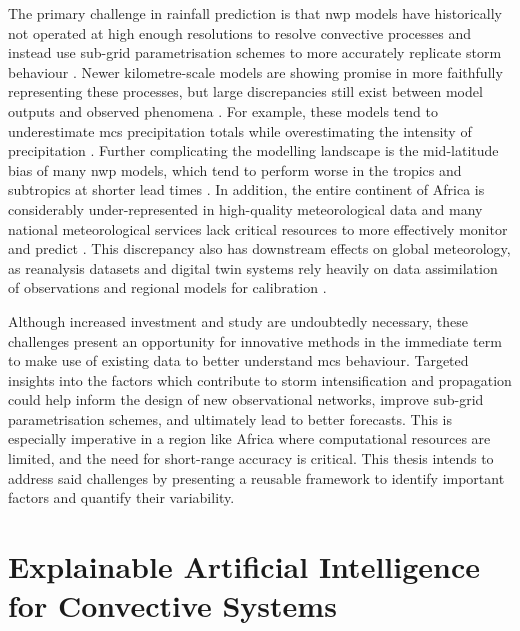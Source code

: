 The primary challenge in rainfall prediction is that \acrfull{nwp} models have historically not operated at high enough resolutions to resolve convective processes and instead use sub-grid parametrisation schemes to more accurately replicate storm behaviour \citep{Stevens2019,Yano2018}. Newer kilometre-scale models are showing promise in more faithfully representing these processes, but large discrepancies still exist between model outputs and observed phenomena \citep{Yano2018}. For example, these models tend to underestimate \acrshort{mcs} precipitation totals while overestimating the intensity of precipitation \citep{Feng2025,Stevens2019}. Further complicating the modelling landscape is the mid-latitude bias of many \acrshort{nwp} models, which tend to perform worse in the tropics and subtropics at shorter lead times \citep{Keane2025}. In addition, the entire continent of Africa is considerably under-represented in high-quality meteorological data and many national meteorological services lack critical resources to more effectively monitor and predict  \citep{Dinku2019,Kinyondo2018,Meque2021}. This discrepancy also has downstream effects on global meteorology, as reanalysis datasets and digital twin systems rely heavily on data assimilation of observations and regional models for calibration \citep{Linsenmeier2023,Valmassoi2023}. 

Although increased investment and study are undoubtedly necessary, these challenges present an opportunity for innovative methods in the immediate term to make use of existing data to better understand \acrshort{mcs} behaviour. Targeted insights into the factors which contribute to storm intensification and propagation could help inform the design of new observational networks, improve sub-grid parametrisation schemes, and ultimately lead to better forecasts. This is especially imperative in a region like Africa where computational resources are limited, and the need for short-range accuracy is critical. This thesis intends to address said challenges by presenting a reusable framework to identify important factors and quantify their variability.

\section{Explainable Artificial Intelligence for Convective Systems}

